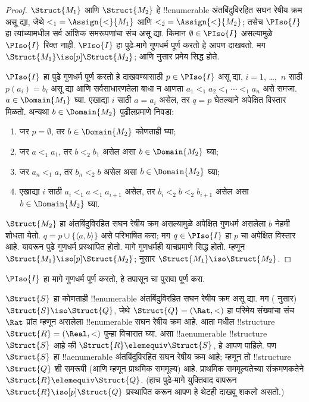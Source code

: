 \documentclass[../../../include/open-logic-section]{subfiles}
\begin{document}
\begin{proof}
  $\Struct{M_1}$ आणि $\Struct{M_2}$ हे !!{enumerable} अंतबिंदुविरहित
  सघन रेषीय क्रम असू द्या, जेथे ${<_1} = \Assign{<}{M_1}$ आणि ${<_2} =
  \Assign{<}{M_2}$; तसेच $\PIso{I}$ हा त्यांच्यामधील सर्व आंशिक
  समरूपणांचा संच असू द्या. किमान $\emptyset \in \PIso{I}$ असल्यामुळे
  $\PIso{I}$ रिक्त नाही. $\PIso{I}$ हा पुढे-मागे गुणधर्म पूर्ण करतो हे
  आपण दाखवतो. मग $\Struct{M_1} \iso[p] \Struct{M_2}$; आणि
   नुसार प्रमेय सिद्ध होते.

  $\PIso{I}$ हा पुढे गुणधर्म पूर्ण करतो हे दाखवण्यासाठी $p \in
  \PIso{I}$ असू द्या, $i = 1$, \dots,~$n$ साठी $p(a_i) = b_i$ असू द्या
  आणि सर्वसाधारणतेला बाधा न आणता $a_1 <_1 a_2 <_1 \cdots <_1 a_n$
  असे समजा. $a \in \Domain{M_1}$ घ्या. एखाद्या $i$ साठी $a = a_i$
  असेल, तर $q = p$ घेतल्याने अपेक्षित विस्तार मिळतो. अन्यथा
  $b \in \Domain{M_2}$ पुढीलप्रमाणे निवडा:
  \begin{enumerate}
  \item जर $p = \emptyset$, तर $b \in \Domain{M_2}$ कोणताही घ्या;
  \item जर $a <_1 a_1$, तर $b <_2 b_1$ असेल असा $b \in
    \Domain{M_2}$ घ्या;
  \item जर $a_n <_1 a$, तर $b_n <_2 b$ असेल असा $b \in \Domain{M_2}$ घ्या;
 \item एखाद्या $i$ साठी $a_i <_1 a <_1 a_{i+1}$ असेल, तर $b_i <_2 b
   <_2 b_{i+1}$ असेल असा $b \in \Domain{M_2}$ घ्या.
  \end{enumerate}
  $\Struct{M_2}$ हा अंतबिंदुविरहित सघन रेषीय क्रम असल्यामुळे अपेक्षित
  गुणधर्म असलेला $b$ नेहमी शोधता येतो. $q = p \cup \{ \langle a, b
  \rangle \}$ असे परिभाषित करा; मग $q \in \PIso{I}$ हा $p$ चा अपेक्षित
  विस्तार आहे. यावरून पुढे गुणधर्म प्रस्थापित होतो. मागे गुणधर्मही
  याचप्रमाणे सिद्ध होतो. म्हणून $\Struct{M_1} \iso[p]
  \Struct{M_2}$;  नुसार $\Struct{M_1} \iso
  \Struct{M_2}$.
\end{proof}

\begin{prob}
  $\PIso{I}$ हा मागे गुणधर्म पूर्ण करतो, हे तपासून
   चा पुरावा पूर्ण करा.
\end{prob}

\begin{rem}
  $\Struct{S}$ हा कोणताही !!{enumerable} अंतबिंदुविरहित सघन रेषीय क्रम
  असू द्या. मग ( नुसार) $\Struct{S} \iso
  \Struct{Q}$, जेथे $\Struct{Q} = (\Rat, <)$ हा परिमेय संख्यांचा संच
  $\Rat$ प्रांत म्हणून असलेला !!{enumerable} सघन रेषीय क्रम आहे. आता
   मधील !!{structure}~$\Struct{R} = (\Real, <)$
  पुन्हा विचारात घ्या. असा !!a{enumerable} !!{structure}~$\Struct{S}$
  आहे की $\Struct{R} \elemequiv \Struct{S}$, हे आपण पाहिले. पण
  $\Struct{S}$ हा !!a{enumerable} अंतबिंदुविरहित सघन रेषीय क्रम आहे;
  म्हणून तो !!{structure}~$\Struct{Q}$ शी समरूपी (आणि म्हणून प्राथमिक
  सममूल्य) आहे. प्राथमिक सममूल्यतेच्या संक्रमणकतेने $\Struct{R}
  \elemequiv \Struct{Q}$. (हाच पुढे-मागे युक्तिवाद वापरून
  $\Struct{R} \iso[p] \Struct{Q}$ प्रस्थापित करून आपण हे थेटही दाखवू
  शकलो असतो.)
\end{rem}
\end{document}
